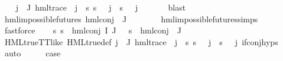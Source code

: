 \begin{isabellebody}
\ \ \isamarkupfalse%
\ {\isachardoublequoteopen}{\isasymforall}j\ {\isasymin}\ J{\isachardot}{\kern0pt}\ hml{\isacharunderscore}{\kern0pt}trace\ {\isacharparenleft}{\kern0pt}{\isasymPsi}\ j{\isacharparenright}{\kern0pt}\ {\isasymand}\ {\isacharparenleft}{\kern0pt}{\isasymforall}s{\isachardot}{\kern0pt}\ s\ {\isasymTurnstile}\ {\isasymPhi}\ j\ {\isasymlongleftrightarrow}\ s\ {\isasymTurnstile}\ {\isasymPsi}\ j{\isacharparenright}{\kern0pt}{\isachardoublequoteclose}\ \isanewline
\ \ \ \ \isamarkupfalse%
\ blast\isanewline
\ \ \isamarkupfalse%
\ {\isachardoublequoteopen}hml{\isacharunderscore}{\kern0pt}impossible{\isacharunderscore}{\kern0pt}futures\ {\isacharparenleft}{\kern0pt}hml{\isacharunderscore}{\kern0pt}conj\ {\isacharbraceleft}{\kern0pt}{\isacharbraceright}{\kern0pt}\ J\ {\isasymPsi}{\isacharparenright}{\kern0pt}{\isachardoublequoteclose}\ \isanewline
\ \ \ \ \isamarkupfalse%
\ hml{\isacharunderscore}{\kern0pt}impossible{\isacharunderscore}{\kern0pt}futures{\isachardot}{\kern0pt}simps\ \isamarkupfalse%
\ fastforce\isanewline
\ \ \isamarkupfalse%
\ {\isachardoublequoteopen}{\isasymforall}s{\isachardot}{\kern0pt}\ s\ {\isasymTurnstile}\ {\isacharparenleft}{\kern0pt}hml{\isacharunderscore}{\kern0pt}conj\ I\ J\ {\isasymPhi}{\isacharparenright}{\kern0pt}\ {\isasymlongleftrightarrow}\ s\ {\isasymTurnstile}\ {\isacharparenleft}{\kern0pt}hml{\isacharunderscore}{\kern0pt}conj\ {\isacharbraceleft}{\kern0pt}{\isacharbraceright}{\kern0pt}\ J\ {\isasymPsi}{\isacharparenright}{\kern0pt}{\isachardoublequoteclose}\ \isanewline
\ \ \ \ \isamarkupfalse%
\ HML{\isacharunderscore}{\kern0pt}true{\isacharunderscore}{\kern0pt}TT{\isacharunderscore}{\kern0pt}like\ HML{\isacharunderscore}{\kern0pt}true{\isacharunderscore}{\kern0pt}def\ {\isacartoucheopen}{\isasymforall}j\ {\isasymin}\ J{\isachardot}{\kern0pt}\ hml{\isacharunderscore}{\kern0pt}trace\ {\isacharparenleft}{\kern0pt}{\isasymPsi}\ j{\isacharparenright}{\kern0pt}\ {\isasymand}\ {\isacharparenleft}{\kern0pt}{\isasymforall}s{\isachardot}{\kern0pt}\ s\ {\isasymTurnstile}\ {\isasymPhi}\ j\ {\isasymlongleftrightarrow}\ s\ {\isasymTurnstile}\ {\isasymPsi}\ j{\isacharparenright}{\kern0pt}{\isacartoucheclose}\ if{\isacharunderscore}{\kern0pt}conj{\isachardot}{\kern0pt}hyps{\isacharparenleft}{\kern0pt}{}{\isacharparenright}{\kern0pt}\ \isamarkupfalse%
\ auto\isanewline
\ \ \isamarkupfalse%
\ \isamarkupfalse%
\ {\isacharquery}{\kern0pt}case\ \isanewline

\end{isabellebody}
